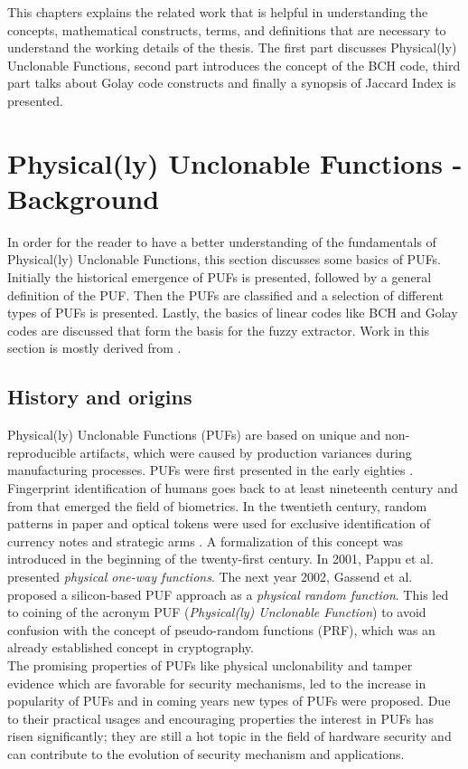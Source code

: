 This chapters explains the related work that is helpful in understanding the concepts, mathematical constructs, terms, and definitions that are necessary to understand the working details of the thesis. The first part discusses Physical(ly) Unclonable Functions, second part introduces the concept of the BCH code, third part talks about Golay code constructs and finally a synopsis of Jaccard Index is presented.

\section{Physical(ly) Unclonable Functions - Background}
In order for the reader to have a better understanding of the fundamentals of Physical(ly) Unclonable Functions, this section discusses some basics of PUFs. Initially the historical emergence of PUFs is presented, followed by a general definition of the PUF. Then the PUFs are classified and a selection of different types of PUFs is presented. Lastly, the basics of linear codes like BCH and Golay codes are discussed that form the basis for the fuzzy extractor. Work in this section is mostly derived
from \cite{17,18}.\\

\subsection{History and origins}
Physical(ly) Unclonable Functions (PUFs) are based on unique and non-reproducible artifacts, which were caused by production variances during manufacturing processes. PUFs were first presented in the early eighties \cite{16}. Fingerprint identification of humans goes back to at least nineteenth century \cite{th21} and from that emerged the field of biometrics. In the twentieth century, random patterns in paper and optical tokens were used for exclusive identification of currency notes and strategic arms \cite{2,8,53}. A
formalization of this concept was introduced in the beginning of the twenty-first century. In 2001, Pappu et al. \cite{19,39} presented \emph{physical one-way functions}. The next year 2002, Gassend et al. \cite{21} proposed a silicon-based PUF approach as a \emph{physical random function}. This led to coining of the acronym PUF (\emph{Physical(ly) Unclonable Function}) to avoid confusion with the concept of pseudo-random functions (PRF), which was an already established concept in cryptography.\\

The promising properties of PUFs like physical unclonability and tamper evidence which are favorable for security mechanisms, led to the increase in popularity of PUFs and in coming years new types of PUFs were proposed. Due to their practical usages and encouraging properties the interest in PUFs has risen significantly; they are still a hot topic in the field of hardware security and can contribute to the evolution of security mechanism and applications.\\

